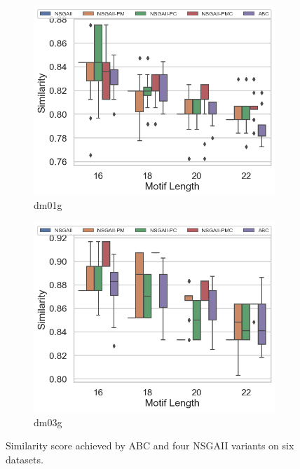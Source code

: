 \begin{figure}[!htbp]
\begin{adjustwidth}{-1cm}{-1cm}
\begin{subfigure}[b]{0.4\textwidth}
			\includegraphics[width=\textwidth]{Figure/dm01g_all_boxplot}
			\caption{dm01g}
		\end{subfigure}%
		\begin{subfigure}[b]{0.4\textwidth}
			\includegraphics[width=\textwidth]{Figure/dm03g_all_boxplot}
			\caption{dm03g}
		\end{subfigure}
		\caption{Similarity score achieved by ABC and four NSGAII variants on six datasets. }
		\label{fig:gen_wise_correlation}
	\end{adjustwidth}
\end{figure}